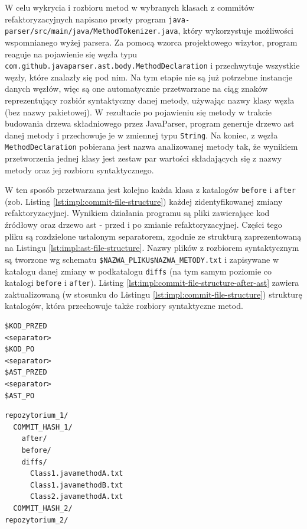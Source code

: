 \documentclass[12pt]{report}
\begin{document}
W celu wykrycia i rozbioru metod w wybranych klasach z commitów refaktoryzacyjnych napisano prosty program \texttt{java-parser/src/main/java/MethodTokenizer.java}\cite{fracz:refactor-extractor}, który wykorzystuje możliwości wspomnianego wyżej parsera. Za pomocą wzorca projektowego wizytor, program reaguje na pojawienie się węzła typu \texttt{com.github.javaparser.ast.body.MethodDeclaration} i przechwytuje wszystkie węzły, które znalazły się pod nim. Na tym etapie nie są już potrzebne instancje danych węzłów, więc są one automatycznie przetwarzane na ciąg znaków reprezentujący rozbiór syntaktyczny danej metody, używając nazwy klasy węzła (bez nazwy pakietowej). W rezultacie po pojawieniu się metody w trakcie budowania drzewa składniowego przez JavaParser, program generuje drzewo \gls{ast} danej metody i przechowuje je w zmiennej typu \texttt{String}. Na koniec, z węzła \texttt{MethodDeclaration} pobierana jest nazwa analizowanej metody tak, że wynikiem przetworzenia jednej klasy jest zestaw par wartości składających się z nazwy metody oraz jej rozbioru syntaktycznego.

W ten sposób przetwarzana jest kolejno każda klasa z katalogów \texttt{before} i \texttt{after} (zob. Listing \ref{lst:impl:commit-file-structure}) każdej zidentyfikowanej zmiany refaktoryzacyjnej. Wynikiem działania programu są pliki zawierające kod źródłowy oraz drzewo \gls{ast} - przed i po zmianie refaktoryzacyjnej. Części tego pliku są rozdzielone ustalonym separatorem, zgodnie ze strukturą zaprezentowaną na Listingu \ref{lst:impl:ast-file-structure}. Nazwy plików z rozbiorem syntaktycznym są tworzone wg schematu \texttt{\$NAZWA\_PLIKU\$NAZWA\_METODY.txt} i zapisywane w katalogu danej zmiany w podkatalogu \texttt{diffs} (na tym samym poziomie co katalogi \texttt{before} i \texttt{after}). Listing \ref{lst:impl:commit-file-structure-after-ast} zawiera zaktualizowaną (w stosunku do Listingu \ref{lst:impl:commit-file-structure}) strukturę katalogów, która przechowuje także rozbiory syntaktyczne metod.

\begin{lstlisting}[frame=single,caption={Struktura pliku przechowującego drzewa \gls{ast} przed i po refaktoryzacji},captionpos=b,label={lst:impl:ast-file-structure}]
$KOD_PRZED
<separator>
$KOD_PO
<separator>
$AST_PRZED
<separator>
$AST_PO
\end{lstlisting}

\begin{lstlisting}[frame=single,caption={Struktura danych przechowujących rozbiór syntaktyczny metod},captionpos=b,label={lst:impl:commit-file-structure-after-ast}]
repozytorium_1/
  COMMIT_HASH_1/
    after/
    before/
    diffs/
      Class1.javamethodA.txt
      Class1.javamethodB.txt
      Class2.javamethodA.txt
  COMMIT_HASH_2/
repozytorium_2/
\end{lstlisting}
\end{document}
